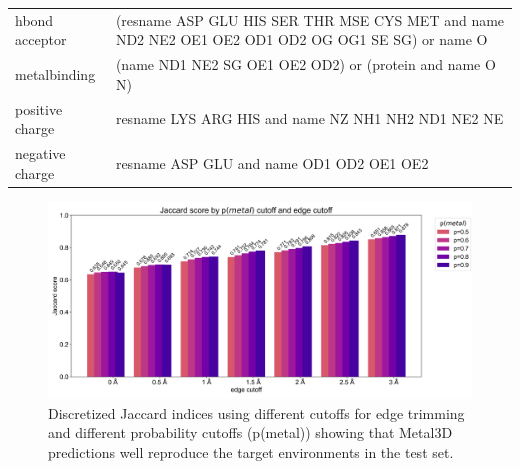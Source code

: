 \documentclass[  ASAPversion,
  ,
  9pt]{elife}
\newenvironment{fignos:tagged-figure}[1][]{
  \let\oldthefigure\thefigure
  \let\oldtheHfigure\theHfigure
  \renewcommand{\thefigure}{#1}
  \renewcommand{\theHfigure}{#1}
}{
  \let\thefigure\oldthefigure
  \let\theHfigure\oldtheHfigure
  \addtocounter{figure}{-1}
}
\newenvironment{tablenos:tagged-table}[1][]{
  \let\oldthetable\thetable
  \let\oldtheHtable\theHtable
  \renewcommand{\thetable}{#1}
  \renewcommand{\theHtable}{#1}
}{
  \let\thetable\oldthetable
  \let\theHtable\oldtheHtable
  \addtocounter{table}{-1}
}
\begin{document}
\begin{tablenos:tagged-table}[S2]
\begin{longtable}[]{@{}ll@{}}
\begin{minipage}[t]{0.14\columnwidth}
hbond acceptor\strut
\end{minipage} & \begin{minipage}[t]{0.81\columnwidth}\raggedright
(resname ASP GLU HIS SER THR MSE CYS MET and name ND2 NE2 OE1 OE2 OD1 OD2 OG OG1 SE SG) or name O\strut
\end{minipage}\tabularnewline
\begin{minipage}[t]{0.14\columnwidth}\raggedright
metalbinding\strut
\end{minipage} & \begin{minipage}[t]{0.81\columnwidth}\raggedright
(name ND1 NE2 SG OE1 OE2 OD2) or (protein and name O N)\strut
\end{minipage}\tabularnewline
\begin{minipage}[t]{0.14\columnwidth}\raggedright
positive charge\strut
\end{minipage} & \begin{minipage}[t]{0.81\columnwidth}\raggedright
resname LYS ARG HIS and name NZ NH1 NH2 ND1 NE2 NE\strut
\end{minipage}\tabularnewline
\begin{minipage}[t]{0.14\columnwidth}\raggedright
negative charge\strut
\end{minipage} & \begin{minipage}[t]{0.81\columnwidth}\raggedright
resname ASP GLU and name OD1 OD2 OE1 OE2\strut
\end{minipage}\tabularnewline
\bottomrule
\end{longtable}

\end{tablenos:tagged-table}

\begin{fignos:tagged-figure}[S1]

\begin{figure}
\hypertarget{fig:jaccard}{%
\centering
\includegraphics{images/jaccard_0.5.jpg}
\caption{Discretized Jaccard indices using different cutoffs for edge trimming and different probability cutoffs (p(metal)) showing that Metal3D predictions well reproduce the target environments in the test set.}\label{fig:jaccard}
}
\end{figure}

\end{fignos:tagged-figure}
\end{document}
